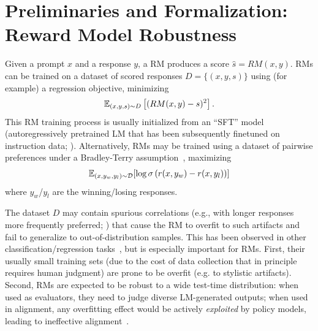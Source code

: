 \section{Preliminaries and Formalization\iflongversion: Reward Model Robustness\fi} \label{sec:background}

Given a prompt $x$ and a response $y$, a RM produces a score $\hat{s}=RM(x,y)$.
RMs can be trained on a dataset of scored responses $D=\{(x,y,s)\}$ using (for example) a regression objective, minimizing
\begin{align} \label{eq:orig-objective}
    \mathbb{E}_{(x,y,s)\sim D}\left[(RM(x,y)-s)^2\right].
\end{align}
This RM training process is usually initialized from an ``SFT'' model (autoregressively pretrained LM that has been subsequently finetuned on instruction data; \citealp{bai2022training,ouyang2022training}).
Alternatively, RMs may be trained using a dataset of pairwise preferences under a Bradley-Terry assumption~\citep{bradley-terry}, maximizing
\begin{align}
    \mathbb{E}_{(x,y_w,y_l)\sim\mathcal{D}}[\log \sigma \left(r(x,y_w) - r(x,y_l)\right)]
\end{align}
where $y_w$/$y_l$ are the winning/losing responses.


The dataset $D$ may contain spurious correlations (e.g., with longer responses more frequently preferred; \citealp{singhal2023long}) that cause the RM to overfit to such artifacts and fail to generalize to out-of-distribution samples.
This has been observed in other classification/regression tasks~,
but is especially important for RMs. 
First, their usually small training sets (due to the cost of data collection that in principle requires human judgment) are prone to be overfit (e.g. to stylistic artifacts).
Second, RMs are expected to be robust to a wide test-time distribution: when used as evaluators, they need to judge diverse LM-generated outputs; when used in alignment, any overfitting effect would be actively \emph{exploited} by policy models, leading to ineffective alignment~.

